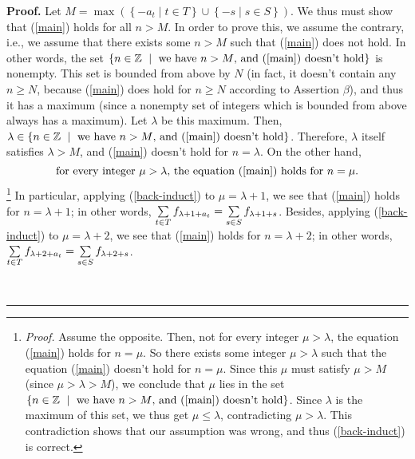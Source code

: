 \documentclass[numbers=enddot,12pt,final,onecolumn,notitlepage]{scrartcl}%
\numberwithin{exer}{section}
\theoremstyle{definition}
\newenvironment{proof}[1][Proof]{\noindent\textbf{#1.} }{\ \rule{0.5em}{0.5em}}
\let\sumnonlimits\sum
\renewcommand{\sum}{\sumnonlimits\limits}
\begin{document}
\begin{proof}
Let $M=\max\left(  \left\{  -a_{t}\mid t\in T\right\}  \cup\left\{  -s\mid
s\in S\right\}  \right)  $. We thus must show that (\ref{main}) holds for all
$n>M$. In order to prove this, we assume the contrary, i.e., we assume that
there exists some $n>M$ such that (\ref{main}) does not hold. In other words,
the set $\left\{  n\in\mathbb{Z}\ \mid\ \text{we have }n>M\text{, and
(\ref{main}) doesn't hold}\right\}  $ is nonempty. This set is bounded from
above by $N$ (in fact, it doesn't contain any $n\geq N$, because (\ref{main})
does hold for $n\geq N$ according to Assertion $\beta$), and thus it has a
maximum (since a nonempty set of integers which is bounded from above always
has a maximum). Let $\lambda$ be this maximum. Then, $\lambda\in\left\{
n\in\mathbb{Z}\ \mid\ \text{we have }n>M\text{, and (\ref{main}) doesn't
hold}\right\}  $. Therefore, $\lambda$ itself satisfies $\lambda>M$, and
(\ref{main}) doesn't hold for $n=\lambda$. On the other hand,%
\begin{equation}
\text{for every integer }\mu>\lambda\text{, the equation (\ref{main}) holds
for }n=\mu.\label{back-induct}%
\end{equation}
\footnote{\textit{Proof.} Assume the opposite. Then, not for every integer
$\mu>\lambda$, the equation (\ref{main}) holds for $n=\mu$. So there exists
some integer $\mu>\lambda$ such that the equation (\ref{main}) doesn't hold
for $n=\mu$. Since this $\mu$ must satisfy $\mu>M$ (since $\mu>\lambda>M$), we
conclude that $\mu$ lies in the set $\left\{  n\in\mathbb{Z}\ \mid\ \text{we
have }n>M\text{, and (\ref{main}) doesn't hold}\right\}  $. Since $\lambda$ is
the maximum of this set, we thus get $\mu\leq\lambda$, contradicting
$\mu>\lambda$. This contradiction shows that our assumption was wrong, and
thus (\ref{back-induct}) is correct.} In particular, applying
(\ref{back-induct}) to $\mu=\lambda+1$, we see that (\ref{main}) holds for
$n=\lambda+1$; in other words, $\sum\limits_{t\in T}f_{\lambda+1+a_{t}}%
=\sum\limits_{s\in S}f_{\lambda+1+s}$. Besides, applying (\ref{back-induct})
to $\mu=\lambda+2$, we see that (\ref{main}) holds for $n=\lambda+2$; in other
words, $\sum\limits_{t\in T}f_{\lambda+2+a_{t}}=\sum\limits_{s\in S}%
f_{\lambda+2+s}$.


\end{proof}
\end{document}
